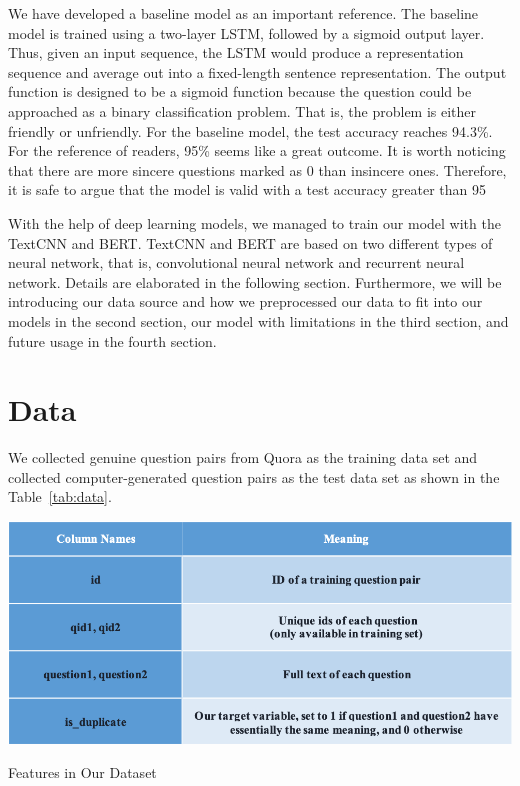 \documentclass{article}
\begin{document}
We have developed a baseline model as an important reference. The baseline model is trained using a two-layer LSTM, followed by a sigmoid output layer. Thus, given an input sequence, the LSTM would produce a representation sequence and average out into a fixed-length sentence representation. The output function is designed to be a sigmoid function because the question could be approached as a binary classification problem. That is, the problem is either friendly or unfriendly. For the baseline model, the test  accuracy reaches 94.3\%. For the reference of readers, 95\% seems like a great outcome. It is worth noticing that there are more sincere questions marked as 0 than insincere ones. Therefore, it is safe to argue that the model is valid with a test accuracy greater than 95%

With the help of deep learning models, we managed to train our model with the TextCNN and BERT. TextCNN and BERT are based on two different types of neural network, that is, convolutional neural network and recurrent neural network.  Details are elaborated in the following section. Furthermore, we will be introducing our data source and how we preprocessed our data to fit into our models in the second section, our model with limitations in the third section, and future usage in the fourth section.

\section{Data}
We collected genuine question pairs from Quora as the training data set and collected computer-generated question pairs as the test data set as shown in the Table~\ref{tab:data}. 

\begin{table}[h!]
	\centering
	\includegraphics[scale=0.8]{data.png}
	\caption{Features in Our Dataset}
	\label{tab:data}
\end{table}
\end{document}
